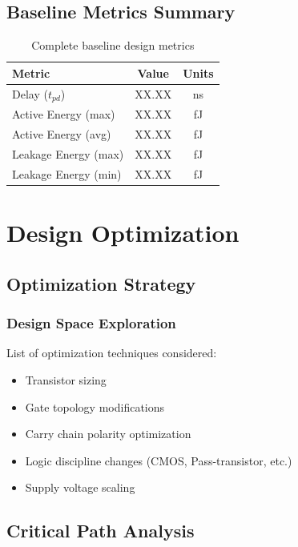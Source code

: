 \documentclass[12pt,letterpaper]{article}
\begin{document}
\subsection{Baseline Metrics Summary}

\begin{table}[H]
\centering
\caption{Complete baseline design metrics}
\label{tab:baseline_summary}
\begin{tabular}{@{}lcc@{}}
\toprule
\textbf{Metric} & \textbf{Value} & \textbf{Units} \\
\midrule
Delay ($t_{pd}$) & XX.XX & ns \\
Active Energy (max) & XX.XX & fJ \\
Active Energy (avg) & XX.XX & fJ \\
Leakage Energy (max) & XX.XX & fJ \\
Leakage Energy (min) & XX.XX & fJ \\
\bottomrule
\end{tabular}
\end{table}

\section{Design Optimization}
\label{sec:optimization}


\subsection{Optimization Strategy}

\subsubsection{Design Space Exploration}

List of optimization techniques considered:
\begin{itemize}
    \item Transistor sizing
    \item Gate topology modifications
    \item Carry chain polarity optimization
    \item Logic discipline changes (CMOS, Pass-transistor, etc.)
    \item Supply voltage scaling
\end{itemize}

\subsection{Critical Path Analysis}
\end{document}
